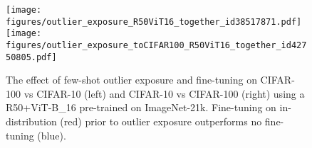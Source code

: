 \documentclass{article}
\begin{document}
\begin{figure}[ht]
	\centering
	\texttt{[image: figures/outlier\_exposure\_R50ViT16\_together\_id38517871.pdf]}
	\texttt{[image: figures/outlier\_exposure\_toCIFAR100\_R50ViT16\_together\_id42750805.pdf]}
	\vspace{-0.5em}
\caption{The effect of few-shot outlier exposure and fine-tuning on CIFAR-100 vs  CIFAR-10 (left) and CIFAR-10 vs  CIFAR-100 (right) using a R50+ViT-B\_16  pre-trained on ImageNet-21k. Fine-tuning on in-distribution (red) prior to outlier exposure outperforms no fine-tuning (blue).
	}
	\vspace{-1em}
	\label{fig:outlier_exposure_R50ViTB16_fine-tunedonCIFAR100}
\end{figure}
\end{document}
